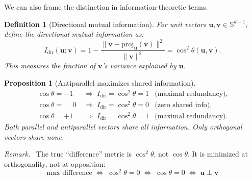 \documentclass[11pt,a4paper]{article}
\newtheorem{proposition}[theorem]{Proposition}
\newtheorem{definition}[theorem]{Definition}
\theoremstyle{remark}
\newenvironment{keyresult}{\par\medskip\noindent\textit{Remark.}\ }{\par\medskip}
\begin{document}
We can also frame the distinction in information-theoretic terms.

\begin{definition}[Directional mutual information]
For unit vectors $\mathbf{u}, \mathbf{v} \in \mathbb{S}^{d-1}$, define the directional mutual information as:
\begin{equation}
  I_\text{dir}(\mathbf{u}; \mathbf{v}) = 1 - \frac{\|\mathbf{v} - \mathrm{proj}_\mathbf{u}(\mathbf{v})\|^2}{\|\mathbf{v}\|^2} = \cos^2\theta(\mathbf{u}, \mathbf{v}).
  \label{eq:dir-mi}
\end{equation}
This measures the fraction of $\mathbf{v}$'s variance explained by $\mathbf{u}$.
\end{definition}

\begin{proposition}[Antiparallel maximizes shared information]
\label{prop:mi-antiparallel}
\begin{align}
  \cos\theta = -1 &\;\Longrightarrow\; I_\text{dir} = \cos^2\theta = 1 & \text{(maximal redundancy)}, \\
  \cos\theta = \phantom{-}0 &\;\Longrightarrow\; I_\text{dir} = \cos^2\theta = 0 & \text{(zero shared info)}, \\
  \cos\theta = +1 &\;\Longrightarrow\; I_\text{dir} = \cos^2\theta = 1 & \text{(maximal redundancy)}.
\end{align}
Both parallel \emph{and} antiparallel vectors share all information.
Only orthogonal vectors share none.
\end{proposition}

\begin{keyresult}
The true ``difference'' metric is $\cos^2\theta$, not $\cos\theta$.
It is minimized at orthogonality, not at opposition:
\begin{equation}
  \boxed{\,\text{max difference} \;\Longleftrightarrow\; \cos^2\theta = 0 \;\Longleftrightarrow\; \cos\theta = 0 \;\Longleftrightarrow\; \mathbf{u} \perp \mathbf{v}\,}
  \label{eq:thesis}
\end{equation}
\end{keyresult}
\end{document}
